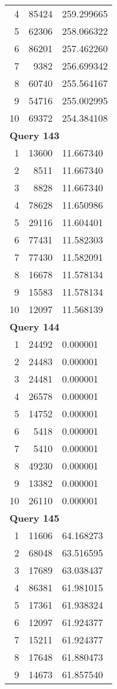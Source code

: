 \begin{longtable}[{p}]{@{}rrp{}@{}}
4 & 85424 & 259.299665 \\
5 & 62306 & 258.066322 \\
6 & 86201 & 257.462260 \\
7 & 9382 & 256.699342 \\
8 & 60740 & 255.564167 \\
9 & 54716 & 255.002995 \\
10 & 69372 & 254.384108 \\
\midrule
\multicolumn{3}{l}{\bfseries Query 143} \\
1 & 13600 & 11.667340 \\
2 & 8511 & 11.667340 \\
3 & 8828 & 11.667340 \\
4 & 78628 & 11.650986 \\
5 & 29116 & 11.604401 \\
6 & 77431 & 11.582303 \\
7 & 77430 & 11.582091 \\
8 & 16678 & 11.578134 \\
9 & 15583 & 11.578134 \\
10 & 12097 & 11.568139 \\
\midrule
\multicolumn{3}{l}{\bfseries Query 144} \\
1 & 24492 & 0.000001 \\
2 & 24483 & 0.000001 \\
3 & 24481 & 0.000001 \\
4 & 26578 & 0.000001 \\
5 & 14752 & 0.000001 \\
6 & 5418 & 0.000001 \\
7 & 5410 & 0.000001 \\
8 & 49230 & 0.000001 \\
9 & 13382 & 0.000001 \\
10 & 26110 & 0.000001 \\
\midrule
\multicolumn{3}{l}{\bfseries Query 145} \\
1 & 11606 & 64.168273 \\
2 & 68048 & 63.516595 \\
3 & 17689 & 63.038437 \\
4 & 86381 & 61.981015 \\
5 & 17361 & 61.938324 \\
6 & 12097 & 61.924377 \\
7 & 15211 & 61.924377 \\
8 & 17648 & 61.880473 \\
9 & 14673 & 61.857540 \\

\end{longtable}
